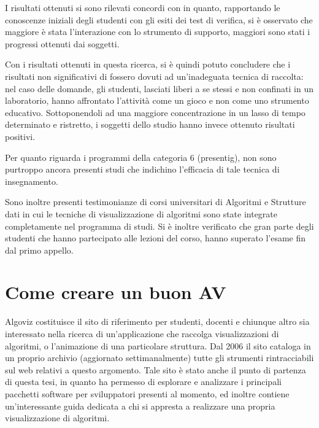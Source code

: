 I risultati ottenuti si sono rilevati concordi con \cite{byrne} in
quanto, rapportando le conoscenze iniziali degli studenti con gli
esiti dei test di verifica, si è osservato che maggiore è stata l'interazione
con lo strumento di supporto, maggiori sono stati i progressi ottenuti
dai soggetti.

Con i risultati ottenuti in questa ricerca, si è quindi potuto concludere
che i risultati non significativi di \cite{jarc} fossero dovuti ad
un'inadeguata tecnica di raccolta: nel caso delle domande, gli studenti,
lasciati liberi a se stessi e non confinati in un laboratorio, hanno
affrontato l'attività come un gioco e non come uno strumento educativo.
Sottoponendoli ad una maggiore concentrazione in un lasso di tempo
determinato e ristretto, i soggetti dello studio \cite{AV-compare}
hanno invece ottenuto risultati positivi.

Per quanto riguarda i programmi della categoria 6 (presentig), non
sono purtroppo ancora presenti studi che indichino l'efficacia di
tale tecnica di insegnamento.

Sono inoltre presenti testimonianze di corsi universitari di Algoritmi
e Strutture dati \cite{course} in cui le tecniche di visualizzazione
di algoritmi sono state integrate completamente nel programma di studi.
Si è inoltre verificato che gran parte degli studenti che hanno partecipato
alle lezioni del corso, hanno superato l'esame fin dal primo appello.


\section{Come creare un buon AV}

Algoviz \cite{wikiAlgoViz} costituisce il sito di riferimento per
studenti, docenti e chiunque altro sia interessato nella ricerca di
un'applicazione che raccolga visualizzazioni di algoritmi, o l'animazione
di una particolare struttura. Dal 2006 il sito cataloga in un proprio
archivio (aggiornato settimanalmente) tutte gli strumenti rintracciabili
sul web relativi a questo argomento. Tale sito è stato anche il punto
di partenza di questa tesi, in quanto ha permesso di esplorare e analizzare
i principali pacchetti software per sviluppatori presenti al momento,
ed inoltre contiene un'interessante guida dedicata a chi si appresta
a realizzare una propria visualizzazione di algoritmi.

